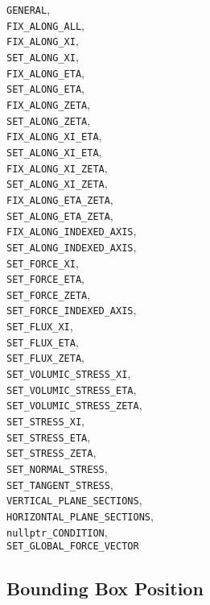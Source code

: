 \documentclass[10pt]{article}
\begin{document}
	\verb+GENERAL+,\\
	\verb+FIX_ALONG_ALL+,\\
	\verb+FIX_ALONG_XI+,\\
	\verb+SET_ALONG_XI+,\\
	\verb+FIX_ALONG_ETA+,\\
	\verb+SET_ALONG_ETA+,\\
	\verb+FIX_ALONG_ZETA+,\\
	\verb+SET_ALONG_ZETA+,\\
	\verb+FIX_ALONG_XI_ETA+,\\
	\verb+SET_ALONG_XI_ETA+,\\
	\verb+FIX_ALONG_XI_ZETA+,\\
	\verb+SET_ALONG_XI_ZETA+,\\
	\verb+FIX_ALONG_ETA_ZETA+,\\
	\verb+SET_ALONG_ETA_ZETA+,\\
	\verb+FIX_ALONG_INDEXED_AXIS+,\\
	\verb+SET_ALONG_INDEXED_AXIS+,\\
	\verb+SET_FORCE_XI+,\\
	\verb+SET_FORCE_ETA+,\\
	\verb+SET_FORCE_ZETA+,\\
	\verb+SET_FORCE_INDEXED_AXIS+,\\
	\verb+SET_FLUX_XI+,\\
	\verb+SET_FLUX_ETA+,\\
	\verb+SET_FLUX_ZETA+,\\
	\verb+SET_VOLUMIC_STRESS_XI+,\\
	\verb+SET_VOLUMIC_STRESS_ETA+,\\
	\verb+SET_VOLUMIC_STRESS_ZETA+,\\
	\verb+SET_STRESS_XI+,\\
	\verb+SET_STRESS_ETA+,\\
	\verb+SET_STRESS_ZETA+,\\
	\verb+SET_NORMAL_STRESS+,\\
	\verb+SET_TANGENT_STRESS+,\\
	\verb+VERTICAL_PLANE_SECTIONS+,\\
	\verb+HORIZONTAL_PLANE_SECTIONS+,\\
	\verb+nullptr_CONDITION+,\\
	\verb+SET_GLOBAL_FORCE_VECTOR+

\subsection{Bounding Box Position}
\end{document}
